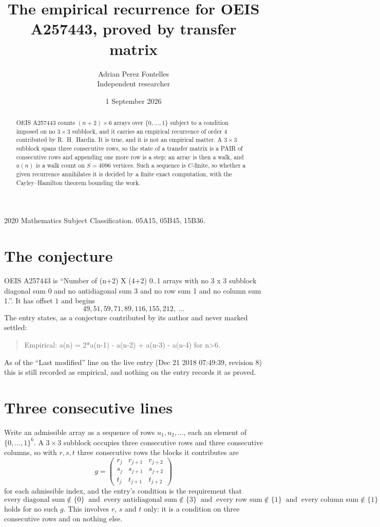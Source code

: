 \documentclass[11pt,a4paper]{article}
\title{The empirical recurrence for OEIS A257443, proved by transfer matrix}
\author{Adrian Perez Fontelles\\ \small Independent researcher}
\date{1 September 2026}
\theoremstyle{plain}
\theoremstyle{definition}
\begin{document}
\maketitle

\begin{abstract}
OEIS A257443 counts $(n+2)\times6$ arrays over $\{0,\dots,1\}$ subject to a condition imposed on
no $3\times3$ subblock, and it carries an empirical recurrence of order $4$
contributed by R.~H.~Hardin. It is true, and it is not an empirical matter. A $3\times3$
subblock spans three consecutive rows, so the state of a transfer matrix is a PAIR of
consecutive rows and appending one more row is a step; an array is then a walk, and
$a(n)$ is a walk count on $S=4096$ vertices. Such a sequence is $C$-finite, so whether a given
recurrence annihilates it is decided by a finite exact computation, with the Cayley--Hamilton
theorem bounding the work.
\end{abstract}

\noindent\small 2020 Mathematics Subject Classification. 05A15, 05B45, 15B36.\normalsize

\section{The conjecture}

OEIS A257443 is ``Number of (n+2) X (4+2) 0..1 arrays with no 3 x 3 subblock diagonal sum 0 and no antidiagonal sum 3 and no row sum 1 and no column sum 1.''. It has offset $1$ and begins
\[
49, 51, 59, 71, 89, 116, 155, 212,\ \dots
\]
The entry states, as a conjecture contributed by its author and never marked settled:
\begin{quote}
Empirical: a(n) = 2*a(n-1) - a(n-2) + a(n-3) - a(n-4) for n>6.
\end{quote}
As of the ``Last modified'' line on the live entry (Dec 21 2018 07:49:39, revision 8) this is still
recorded as empirical, and nothing on the entry records it as proved.

\section{Three consecutive lines}

Write an admissible array as a sequence of rows $u_1,u_2,\dots$, each an element of
$\{0,\dots,1\}^{6}$. A $3\times3$ subblock occupies three consecutive rows and
three consecutive columns, so with $r,s,t$ three consecutive rows the blocks it
contributes are
\[
g=\begin{pmatrix}r_j&r_{j+1}&r_{j+2}\\ s_j&s_{j+1}&s_{j+2}\\ t_j&t_{j+1}&t_{j+2}\end{pmatrix}
\]
for each admissible index, and the entry's condition is the requirement that
\[
\text{every diagonal sum} \notin \{0\}\ \text{ and }\ \text{every antidiagonal sum} \notin \{3\}\ \text{ and }\ \text{every row sum} \notin \{1\}\ \text{ and }\ \text{every column sum} \notin \{1\}
\]
holds for no such $g$. This involves $r$, $s$ and $t$ only: it is a condition on
three consecutive rows and on nothing else.
\end{document}
